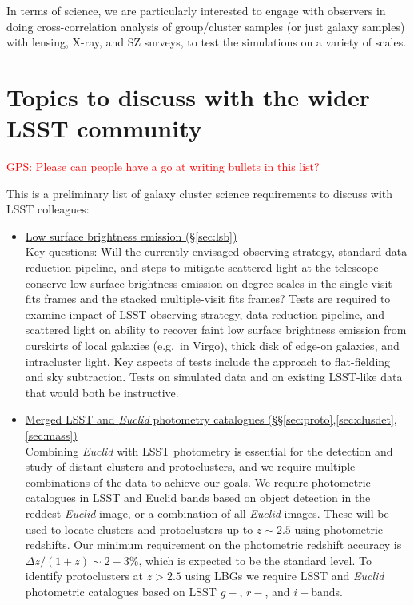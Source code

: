 \documentclass[a4paper,11pt]{article}
\newcommand{\red}{\textcolor{red}}
\begin{document}
In terms of science, we are particularly interested to engage with observers in doing cross-correlation analysis of group/cluster samples (or just galaxy samples) with lensing, X-ray, and SZ surveys, to test the simulations on a variety of scales.   


\section{Topics to discuss with the wider LSST community}

\red{GPS: Please can people have a go at writing bullets in this
  list?}

\noindent This is a preliminary list of galaxy cluster science
requirements to discuss with LSST colleagues:
\begin{itemize}
\item\underline{Low surface brightness emission
  (\S\ref{sec:lsb})}\smallskip\\Key questions: Will the currently
  envisaged observing strategy, standard data reduction pipeline, and
  steps to mitigate scattered light at the telescope conserve low
  surface brightness emission on degree scales in the single visit
  fits frames and the stacked multiple-visit fits frames?  Tests are
  required to examine impact of LSST observing strategy, data
  reduction pipeline, and scattered light on ability to recover faint
  low surface brightness emission from ourskirts of local galaxies
  (e.g.\ in Virgo), thick disk of edge-on galaxies, and intracluster
  light.  Key aspects of tests include the approach to flat-fielding
  and sky subtraction.  Tests on simulated data and on existing
  LSST-like data that would both be instructive.

\item\underline{Merged LSST and \emph{Euclid} photometry 
  catalogues
  (\S\S\ref{sec:proto},\ref{sec:clusdet},\ref{sec:mass})}\smallskip\\

Combining \emph{Euclid} with LSST photometry is essential for the detection and study of distant clusters and protoclusters, and we require multiple combinations of the data to achieve our goals.  We require photometric catalogues in LSST and Euclid bands based on object detection in the reddest \emph{Euclid} image, or a combination of all \emph{Euclid} images. These will be used to locate clusters and protoclusters up to $z\sim2.5$ using photometric redshifts. Our minimum requirement on the photometric redshift accuracy is $\Delta z/(1+z)\sim2-3$\%, which is expected to be the standard level. To identify protoclusters at $z>2.5$ using LBGs we require LSST and \emph{Euclid} photometric catalogues based on LSST $g-$, $r-$, and $i-$bands.


\end{itemize}
\end{document}
